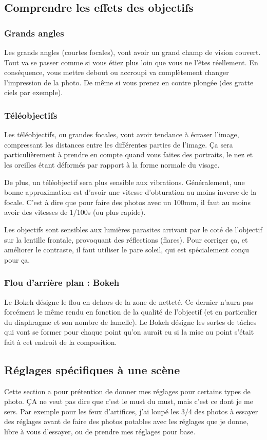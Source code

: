 \documentclass[a4paper,twoside]{article}
\begin{document}
\subsection{Comprendre les effets des objectifs}
\subsubsection{Grands angles}
Les grands angles (courtes focales), vont avoir un grand champ de vision couvert. Tout va se passer comme si vous étiez plus loin que vous ne l'êtes réellement. En conséquence, vous mettre debout ou accroupi va complètement changer l'impression de la photo. De même si vous prenez en contre plongée (des gratte ciels par exemple).

\subsubsection{Téléobjectifs}
Les téléobjectifs, ou grandes focales, vont avoir tendance à écraser l'image, compressant les distances entre les différentes parties de l'image. Ça sera particulièrement à prendre en compte quand vous faites des portraits, le nez et les oreilles étant déformés par rapport à la forme normale du visage. 

De plus, un téléobjectif sera plus sensible aux vibrations. Généralement, une bonne approximation est d'avoir une vitesse d'obturation au moins inverse de la focale. C'est à dire que pour faire des photos avec un 100mm, il faut au moins avoir des vitesses de 1/100s (ou plus rapide).

Les objectifs sont sensibles aux lumières parasites arrivant par le coté de l'objectif sur la lentille frontale, provoquant des réflections (flares). Pour corriger ça, et améliorer le contraste, il faut utiliser le pare soleil, qui est spécialement conçu pour ça.

\subsubsection{Flou d'arrière plan : Bokeh}
Le Bokeh désigne le flou en dehors de la zone de netteté. Ce dernier n'aura pas forcément le même rendu en fonction de la qualité de l'objectif (et en particulier du diaphragme et son nombre de lamelle). Le Bokeh désigne les sortes de tâches qui vont se former pour chaque point qu'on aurait eu si la mise au point s'était fait à cet endroit de la composition. 

\subsection{Réglages spécifiques à une scène}
Cette section a pour prétention de donner mes réglages pour certains types de photo. ÇA ne veut pas dire que c'est le must du must, mais c'est ce dont je me sers. Par exemple pour les feux d'artifices, j'ai loupé les 3/4 des photos à essayer des réglages avant de faire des photos potables avec les réglages que je donne, libre à vous d'essayer, ou de prendre mes réglages pour base. 
\end{document}
